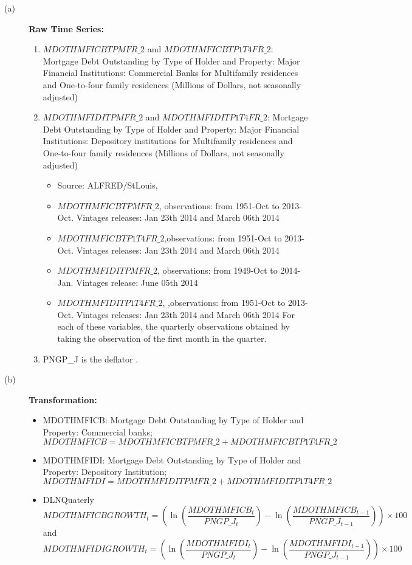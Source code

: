 \documentclass[3p,review,times]{elsarticle}		%
\begin{document}
\begin{description}
	\item[(a)] \textbf{Raw Time Series:}
	\begin{enumerate}
		\item $MDOTHMFICBTPMFR\_2$ and $MDOTHMFICBTP1T4FR\_2$: Mortgage Debt Outstanding by Type of Holder and Property: Major Financial Institutions: Commercial Banks for Multifamily residences and One-to-four family residences 
		(Millions of Dollars, not seasonally adjusted)
		\item $MDOTHMFIDITPMFR\_2$ and $MDOTHMFIDITP1T4FR\_2$: Mortgage Debt Outstanding by Type of Holder and Property: Major Financial Institutions: Depository institutions for Multifamily residences and One-to-four family residences 
		(Millions of Dollars, not seasonally adjusted)
		
		\begin{itemize}
			\item Source: ALFRED/StLouis,
			\item $MDOTHMFICBTPMFR\_2$, observations: from 1951-Oct to 2013-Oct. Vintages releases: Jan 23th 2014 and March 06th 2014
			\item $MDOTHMFICBTP1T4FR\_2$,observations: from 1951-Oct to 2013-Oct. Vintages releases: Jan 23th 2014 and March 06th 2014
			\item $MDOTHMFIDITPMFR\_2$,  observations: from 1949-Oct to  2014-Jan. Vintages release: June 05th 2014
			\item $MDOTHMFIDITP1T4FR\_2$, ,observations: from 1951-Oct to 2013-Oct. Vintages releases: Jan 23th 2014 and March 06th 2014
			For each of these variables,  the quarterly observations obtained by taking the observation of the first month in the quarter. 
		\end{itemize}
		\item PNGP\_J is the deflator .
	\end{enumerate}
	\item[(b)] \textbf{Transformation:}
	\begin{itemize}
		\item MDOTHMFICB: Mortgage Debt Outstanding by Type of Holder and Property: Commercial banks;
		$$MDOTHMFICB=MDOTHMFICBTPMFR\_2+MDOTHMFICBTP1T4FR\_2$$
		\item  MDOTHMFIDI: Mortgage Debt Outstanding by Type of Holder and Property: Depository Institution;
		$$MDOTHMFIDI=MDOTHMFIDITPMFR\_2+MDOTHMFIDITP1T4FR\_2$$
		
		\item DLNQuaterly 
		$$MDOTHMFICBGROWTH_{t}=\left(\ln\left(\frac{MDOTHMFICB_t}{PNGP\_J_t}\right)-\ln\left(\frac{MDOTHMFICB_{t-1}}{PNGP\_J_{t-1}}\right)\right)\times 100$$ 
		and
		$$MDOTHMFIDIGROWTH_{t}=\left(\ln\left(\frac{MDOTHMFIDI_t}{PNGP\_J_t}\right)-\ln\left(\frac{MDOTHMFIDI_{t-1}}{PNGP\_J_{t-1}}\right)\right)\times 100$$ 
	\end{itemize}
\end{description}
\end{document}
